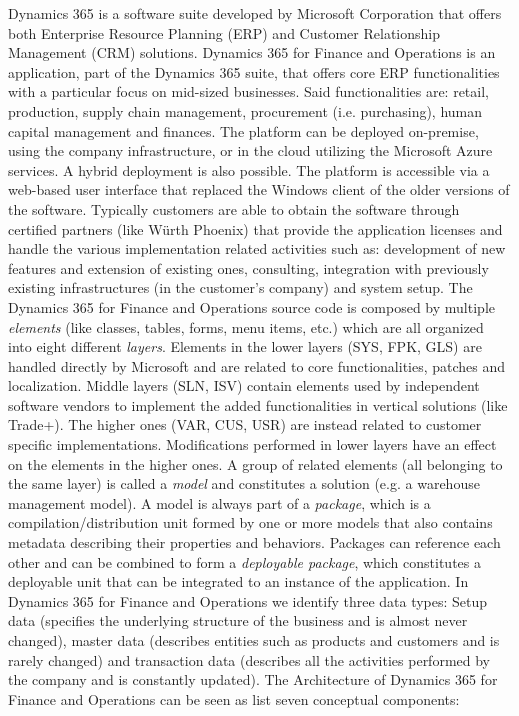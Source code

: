 Dynamics 365 \cite{D365Book} is a software suite developed by Microsoft Corporation that offers both Enterprise Resource Planning (ERP) and Customer Relationship Management (CRM) solutions. Dynamics 365 for Finance and Operations is an application, part of the Dynamics 365 suite, that offers core ERP functionalities with a particular focus on mid-sized businesses. Said functionalities are: retail, production, supply chain management, procurement (i.e. purchasing), human capital management and finances. The platform can be deployed on-premise, using the company infrastructure, or in the cloud utilizing the Microsoft Azure services. A hybrid deployment is also possible. The platform is accessible via a web-based user interface that replaced the Windows client of the older versions of the software. Typically customers are able to obtain the software through certified partners (like Würth Phoenix) that provide the application licenses and handle the various implementation related activities such as: development of new features and extension of existing ones, consulting, integration with previously existing infrastructures (in the customer's company) and system setup. The Dynamics 365 for Finance and Operations source code is composed by multiple \textit{elements} (like classes, tables, forms, menu items, etc.) which are all organized into eight different \textit{layers}. Elements in the lower layers (SYS, FPK, GLS) are handled directly by Microsoft and are related to core functionalities, patches and localization. Middle layers (SLN, ISV) contain elements used by independent software vendors to implement the added functionalities in vertical solutions (like Trade+).  The higher ones (VAR, CUS, USR) are instead related to customer specific implementations. Modifications performed in lower layers have an effect on the elements in the higher ones. A group of related elements (all belonging to the same layer) is called a \textit{model} and constitutes a solution (e.g. a warehouse management model). A model is always part of a \textit{package}, which is a compilation/distribution unit formed by one or more models that also contains metadata describing their properties and behaviors. Packages can reference each other and can be combined to form a \textit{deployable package}, which constitutes a deployable unit that can be integrated to an instance of the application. In Dynamics 365 for Finance and Operations we identify three data types: Setup data (specifies the underlying structure of the business and is almost never changed), master data (describes entities such as products and customers and is rarely changed) and transaction data (describes all the activities performed by the company and is constantly updated). The Architecture \cite{D365Book2} of Dynamics 365 for Finance and Operations can be seen as list seven conceptual components:

